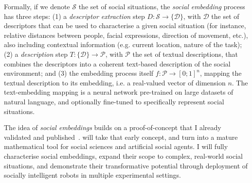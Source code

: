 Formally, if we denote $\mathcal{S}$ the set of social situations, the
\emph{social embedding} process has three steps: (1) a \emph{descriptor
extraction} step $D : \mathcal{S} \to \{\mathcal{D}\}$, with $\mathcal{D}$ the
set of descriptors that can be used to characterise a given social situation
(for instance, relative distances between people, facial expressions, direction
of movement, etc.), also including contextual information (e.g. current
location, nature of the task); (2) a \emph{description} step $T: \{\mathcal{D}\}
\to \mathcal{P}$, with $\mathcal{P}$ the set of textual descriptions, that
combines the descriptors into a coherent text-based description of the social
environment; and (3) the embedding process itself $f : \mathcal{P} \to [0;1]^n$,
mapping the textual description to its embedding, i.e. a real-valued vector of
dimension $n$. The text-embedding mapping is a neural network pre-trained on
large datasets of natural language, and optionally fine-tuned to specifically
represent social situations.

The idea of \emph{social embeddings} builds on a proof-of-concept that I already
validated and published~\cite{lemaignan2024social}. \project will take that
early concept, and turn into a mature mathematical tool for social sciences and
artificial social agents. I will fully characterise social embeddings, expand
their scope to complex, real-world social situations, and demonstrate their
transformative potential through deployment of socially intelligent robots in
multiple experimental settings.

%
%

